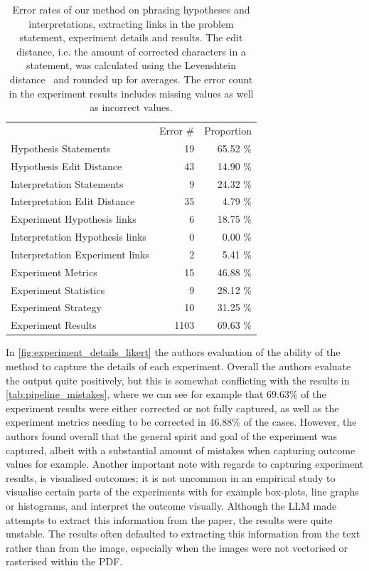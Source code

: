 \documentclass[letterpaper]{article} %
\begin{document}
\begin{table}
    \centering
    \begin{tabular}{l|rr}
         & Error \# & Proportion \\
        Hypothesis Statements & 19 & 65.52 \% \\
        Hypothesis Edit Distance & 43 & 14.90 \% \\
        Interpretation Statements & 9 & 24.32 \% \\
        Interpretation Edit Distance & 35 & 4.79 \% \\
        \hline
        Experiment Hypothesis links & 6 & 18.75 \% \\
        Interpretation Hypothesis links & 0 & 0.00 \% \\
        Interpretation Experiment links & 2 & 5.41 \% \\
        \hline
        Experiment Metrics & 15 & 46.88 \% \\
        Experiment Statistics & 9 & 28.12 \% \\
        Experiment Strategy & 10 & 31.25 \% \\
        Experiment Results & 1103 & 69.63 \% \\

    \end{tabular}
    \caption{Error rates of our method on phrasing hypotheses and interpretations, extracting links in the problem statement, experiment details and results. The edit distance, i.e.{} the amount of corrected characters in a statement, was calculated using the Levenshtein distance~\cite{miller2009levenshtein} and rounded up for averages. The error count in the experiment results includes missing values as well as incorrect values.}
    \label{tab:pipeline_mistakes}
\end{table}

In \autoref{fig:experiment_details_likert} the authors evaluation of the ability of the method to capture the details of each experiment. Overall the authors evaluate the output quite positively, but this is somewhat conflicting with the results in \autoref{tab:pipeline_mistakes}, where we can see for example that $69.63\%$ of the experiment results were either corrected or not fully captured, as well as the experiment metrics needing to be corrected in $46.88\%$ of the cases. However, the authors found overall that the general spirit and goal of the experiment was captured, albeit with a substantial amount of mistakes when capturing outcome values for example. Another important note with regards to capturing experiment results, is visualised outcomes; it is not uncommon in an empirical study to visualise certain parts of the experiments with for example box-plots, line graphs or histograms, and interpret the outcome visually. Although the LLM made attempts to extract this information from the paper, the results were quite unstable. The results often defaulted to extracting this information from the text rather than from the image, especially when the images were not vectorised or rasterised within the PDF.
\end{document}
